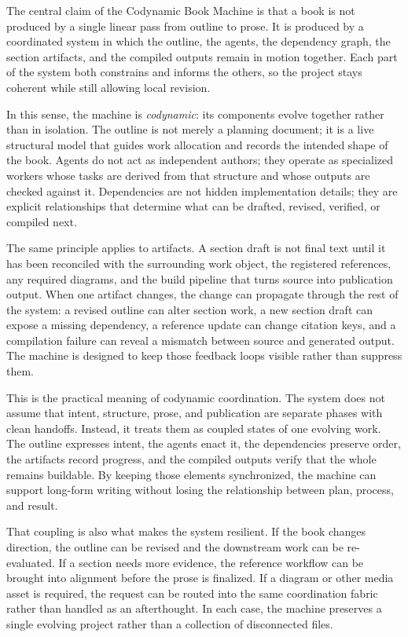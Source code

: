 The central claim of the Codynamic Book Machine is that a book is not produced by a single linear pass from outline to prose. It is produced by a coordinated system in which the outline, the agents, the dependency graph, the section artifacts, and the compiled outputs remain in motion together. Each part of the system both constrains and informs the others, so the project stays coherent while still allowing local revision.

In this sense, the machine is \emph{codynamic}: its components evolve together rather than in isolation. The outline is not merely a planning document; it is a live structural model that guides work allocation and records the intended shape of the book. Agents do not act as independent authors; they operate as specialized workers whose tasks are derived from that structure and whose outputs are checked against it. Dependencies are not hidden implementation details; they are explicit relationships that determine what can be drafted, revised, verified, or compiled next.

The same principle applies to artifacts. A section draft is not final text until it has been reconciled with the surrounding work object, the registered references, any required diagrams, and the build pipeline that turns source into publication output. When one artifact changes, the change can propagate through the rest of the system: a revised outline can alter section work, a new section draft can expose a missing dependency, a reference update can change citation keys, and a compilation failure can reveal a mismatch between source and generated output. The machine is designed to keep those feedback loops visible rather than suppress them.

This is the practical meaning of codynamic coordination. The system does not assume that intent, structure, prose, and publication are separate phases with clean handoffs. Instead, it treats them as coupled states of one evolving work. The outline expresses intent, the agents enact it, the dependencies preserve order, the artifacts record progress, and the compiled outputs verify that the whole remains buildable. By keeping those elements synchronized, the machine can support long-form writing without losing the relationship between plan, process, and result.

That coupling is also what makes the system resilient. If the book changes direction, the outline can be revised and the downstream work can be re-evaluated. If a section needs more evidence, the reference workflow can be brought into alignment before the prose is finalized. If a diagram or other media asset is required, the request can be routed into the same coordination fabric rather than handled as an afterthought. In each case, the machine preserves a single evolving project rather than a collection of disconnected files.

